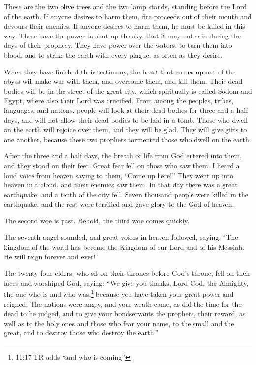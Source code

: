 \myverse{}These are the two olive trees and the two lamp stands, standing
before the Lord of the earth.
\myverse{}If anyone desires to harm them, fire proceeds out of their mouth and devours
their enemies. If anyone desires to harm them, he must be killed in this way.
\myverse{}These have the power to shut up the sky, that it may not rain during the days
of their prophecy. They have power over the waters, to turn them into blood, and to strike the earth with
every plague, as often as they desire.

\myverse{}When they have finished their testimony, the beast that comes
up out of the abyss will make war with them, and overcome them, and kill them.
\myverse{}Their dead bodies will be in the street of the great city, which spiritually
is called Sodom and Egypt, where also their Lord was crucified.
\myverse{}From among the peoples, tribes, languages, and nations, people will look at
their dead bodies for three and a half days, and will not allow their dead bodies to be laid in a tomb.
\myverse{}Those who dwell on the earth will rejoice over them, and they will be glad.
They will give gifts to one another, because these two prophets tormented those who dwell on the earth.

\myverse{}After the three and a half days, the breath of life from God
entered into them, and they stood on their feet. Great fear fell on those who saw them.
\myverse{}I heard a loud voice from heaven saying to them, “Come up here!” They went
up into heaven in a cloud, and their enemies saw them.
\myverse{}In that day there was a great earthquake, and a tenth of the city fell. Seven
thousand people were killed in the earthquake, and the rest were terrified and gave glory to the God of
heaven.

\myverse{}The second woe is past. Behold, the third woe comes quickly.

\myverse{}The seventh angel sounded, and great voices in heaven followed,
saying, “The kingdom of the world has become the Kingdom of our Lord and of his Messiah. He will reign
forever and ever!”

\myverse{}The twenty-four elders, who sit on their thrones before God’s
throne, fell on their faces and worshiped God,
\myverse{}saying: “We give you thanks, Lord God, the Almighty, the one who is and who
was,\footnote{11:17 TR adds “and who is coming”} because you have taken your great power and reigned.
\myverse{}The nations were angry, and your wrath came, as did the time for the dead
to be judged, and to give your bondservants the prophets, their reward, as well as to the holy ones and
those who fear your name, to the small and the great, and to destroy those who destroy the earth.”

